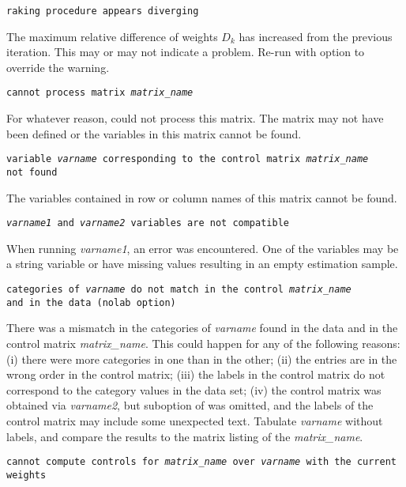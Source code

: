     \noindent
    {\tt raking procedure appears diverging}

    \morehang
    The maximum relative difference of weights $D_k$ has increased from
    the previous
    iteration. This may or may not indicate a problem. Re-run 
    with  option to override the warning.

    \noindent
    {\tt cannot process matrix {\it matrix{\_}name}}

    \morehang
    For whatever reason,  could not process this matrix.
    The matrix may not have been defined or the variables in this matrix
    cannot be found.

    \noindent
    {\tt variable {\it varname} corresponding to the control matrix
    {\it matrix{\_}name} \\ not found}

    \morehang
    The variables contained in row or column names of this matrix
    cannot be found.

    \noindent
    {\tt {\it varname1} and {\it varname2} variables are not compatible}

    \morehang
    When running  {\it varname1}\stcmd{)},
    an error was encountered. One of the variables may be a string variable
    or have missing values resulting in an empty estimation sample.

    \noindent
    {\tt categories of {\it varname} do not match in the control {\it matrix{\_}name} \\
    and in the data (nolab option)}

    \morehang
    There was a mismatch in the categories of {\it varname} found in the data
    and in the control matrix {\it matrix{\_}name}. This could happen for any of the
    following reasons: (i) there were more categories in one than in the other;
    (ii) the entries are in the wrong order in the control matrix; (iii) the labels
    in the control matrix do not correspond to the category values in the data set;
    (iv) the control matrix was obtained via 
    {\it varname2}\stcmd{)}, but  suboption
    of  was omitted, and the labels of the control matrix may include
    some unexpected text. Tabulate {\it varname} without labels, and compare the results
    to the matrix listing of the {\it matrix{\_}name}.

    \noindent
    {\tt cannot compute controls for {\it matrix{\_}name} over
    {\it varname} with the current \\ weights}

